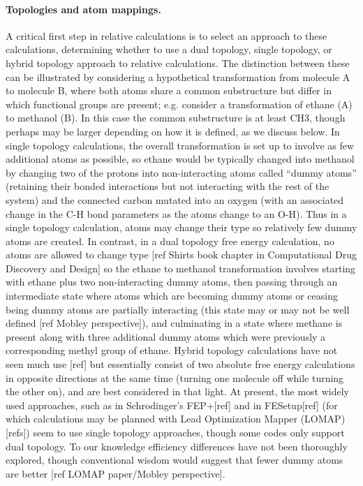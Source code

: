 \documentclass[9pt,bestpractices]{livecoms}
\begin{document}
\paragraph{Topologies and atom mappings.} A critical first step in relative calculations is to select an approach to these calculations, determining whether to use a dual topology, single topology, or hybrid topology approach to relative calculations.
The distinction between these can be illustrated by considering a hypothetical transformation from molecule A to molecule B, where both atoms share a common substructure but differ in which functional groups are present; e.g. consider a transformation of ethane (A) to methanol (B).
In this case the common substructure is at least CH3, though perhaps may be larger depending on how it is defined, as we discuss below.
In single topology calculations, the overall transformation is set up to involve as few additional atoms as possible, so ethane would be typically changed into methanol by changing two of the protons into non-interacting atoms called ``dummy atoms'' (retaining their bonded interactions but not interacting with the rest of the system) and the connected carbon mutated into an oxygen (with an associated change in the C-H bond parameters as the atoms change to an O-H).
Thus in a single topology calculation, atoms may change their type so relatively few dummy atoms are created.
In contrast, in a dual topology free energy calculation, no atoms are allowed to change type [ref Shirts book chapter in Computational Drug Discovery and Design] so the ethane to methanol transformation involves starting with ethane plus two non-interacting dummy atoms, then passing through an intermediate state where atoms which are becoming dummy atoms or ceasing being dummy atoms are partially interacting (this state may or may not be well defined [ref Mobley perspective]), and culminating in a state where methane is present along with three additional dummy atoms which were previously a corresponding methyl group of ethane.
Hybrid topology calculations have not seen much use [ref] but essentially consist of two absolute free energy calculations in opposite directions at the same time (turning one molecule off while turning the other on), and are best considered in that light.
At present, the most widely used approaches, such as in Schrodinger's FEP+[ref] and in FESetup[ref] (for which calculations may be planned with Lead Optimization Mapper (LOMAP) [refs]) seem to use single topology approaches, though some codes only support dual topology.
To our knowledge efficiency differences have not been thoroughly explored, though conventional wisdom would suggest that fewer dummy atoms are better [ref LOMAP paper/Mobley perspective].
\end{document}
